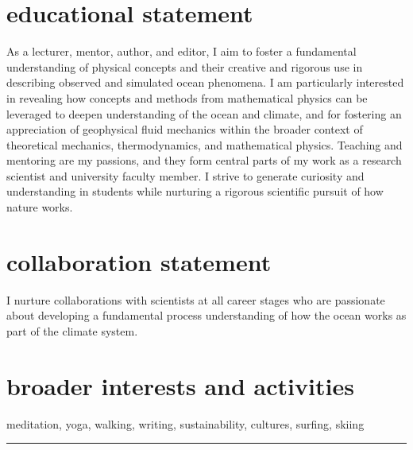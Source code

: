 \documentclass{article}
\begin{document}
\vspace{-.5cm}
\section*{\sc \color{Maroon} educational statement}
\vspace{-.3cm}
As a lecturer, mentor, author, and editor, I aim to foster a fundamental understanding of physical concepts and their creative and rigorous use in describing observed and simulated ocean phenomena. I am particularly interested in revealing how concepts and methods from mathematical physics can be leveraged to deepen understanding of the ocean and climate, and for fostering an appreciation of geophysical fluid mechanics within the broader context of theoretical mechanics, thermodynamics, and mathematical physics.  
Teaching and mentoring are my passions, and they form central parts of my work as a research scientist and university faculty member. I strive to generate curiosity and understanding in students while nurturing a rigorous scientific pursuit of how nature works. 

\vspace{-.5cm}
\section*{\sc  \color{Maroon}  collaboration statement}
\vspace{-.3cm}
I nurture collaborations with scientists at all career stages who are passionate about  developing a fundamental process understanding of how the ocean works as part of the climate system. 

\vspace{-.5cm}
\section*{\sc  \color{Maroon}  broader interests and activities}
\vspace{-.3cm}
meditation, yoga, walking, writing, sustainability, cultures, surfing, skiing

\noindent\rule{\textwidth}{1pt}

\vspace{-.5cm}
\end{document}
